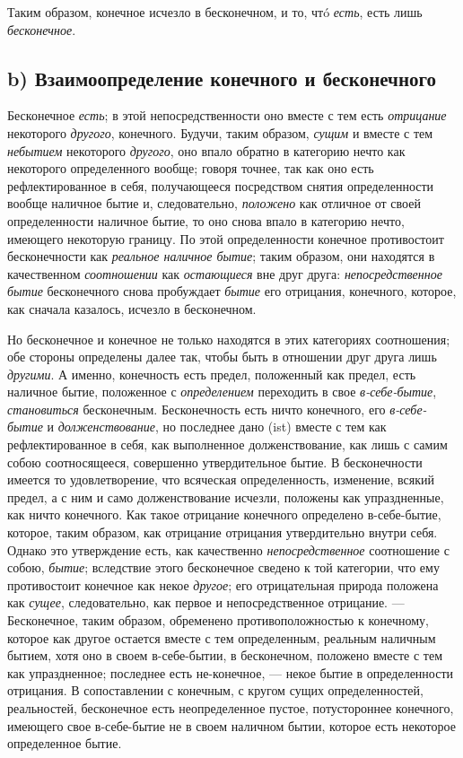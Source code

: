 Таким образом, конечное исчезло в бесконечном, и то, чтó
{\em есть}, есть лишь
{\em бесконечное}.

\subsection*{b) Взаимоопределение конечного и бесконечного}
Бесконечное {\em есть}; в этой непосредственности оно
вместе с тем есть {\em отрицание} некоторого
{\em другого}, конечного. Будучи, таким образом,
{\em сущим} и вместе с тем
{\em небытием} некоторого
{\em другого}, оно впало обратно в категорию нечто как
некоторого определенного вообще; говоря точнее, так как оно есть
рефлектированное в себя, получающееся посредством снятия определенности
вообще наличное бытие и, следовательно, {\em положено}
как отличное от своей определенности наличное бытие, то оно снова впало в
категорию нечто, имеющего некоторую границу. По этой определенности
конечное противостоит бесконечности как {\em реальное
наличное бытие}; таким образом, они находятся в качественном
{\em соотношении} как
{\em остающиеся} вне друг друга:
{\em непосредственное бытие} бесконечного снова
пробуждает {\em бытие} его отрицания, конечного,
которое, как сначала казалось, исчезло в бесконечном.

Но бесконечное и конечное не только находятся в этих категориях соотношения;
обе стороны определены далее так, чтобы быть в отношении друг друга лишь
{\em другими}. А именно, конечность есть предел,
положенный как предел, есть наличное бытие, положенное с
{\em определением} переходить в свое
{\em в-себе-бытие},
{\em становиться} бесконечным. Бесконечность есть ничто
конечного, его {\em в-себе-бытие} и
{\em долженствование}, но последнее дано (ist) вместе с
тем как рефлектированное в себя, как выполненное долженствование, как лишь
с самим собою соотносящееся, совершенно утвердительное бытие. В
бесконечности имеется то удовлетворение, что всяческая определенность,
изменение, всякий предел, а с ним и само долженствование исчезли, положены
как упраздненные, как ничто конечного. Как такое отрицание конечного
определено в-себе-бытие, которое, таким образом, как отрицание отрицания
утвердительно внутри себя. Однако это утверждение есть, как качественно
{\em непосредственное} соотношение с собою,
{\em бытие}; вследствие этого бесконечное сведено к той
категории, что ему противостоит конечное как некое
{\em другое}; его отрицательная природа положена как
{\em сущее}, следовательно, как первое и
непосредственное отрицание. — Бесконечное, таким образом, обременено
противоположностью к конечному, которое как другое остается вместе с тем
определенным, реальным наличным бытием, хотя оно в своем в-себе-бытии, в
бесконечном, положено вместе с тем как упраздненное; последнее есть
не-конечное, — некое бытие в определенности отрицания. В сопоставлении с
конечным, с кругом сущих определенностей, реальностей, бесконечное есть
неопределенное пустое, потустороннее конечного, имеющего свое в-себе-бытие
не в своем наличном бытии, которое есть некоторое определенное бытие.

